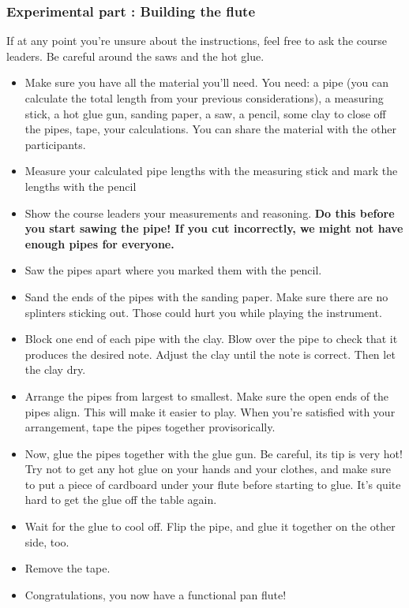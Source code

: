 \subsubsection{Experimental part : Building the flute}
If at any point you're unsure about the instructions, feel free to ask the course leaders. Be careful around the saws and the hot glue.
\begin{itemize}
    \item Make sure you have all the material you'll need. You need: a pipe (you can calculate the total length from your previous considerations), a measuring stick, a hot glue gun, sanding paper, a saw, a pencil, some clay to close off the pipes, tape, your calculations. You can share the material with the other participants.
    \item Measure your calculated pipe lengths with the measuring stick and mark the lengths with the pencil
    \item Show the course leaders your measurements and reasoning. \textbf{Do this before you start sawing the pipe! If you cut incorrectly, we might not have enough pipes for everyone.}
    \item Saw the pipes apart where you marked them with the pencil.
    \item Sand the ends of the pipes with the sanding paper. Make sure there are no splinters sticking out. Those could hurt you while playing the instrument.
    \item Block one end of each pipe with the clay. Blow over the pipe to check that it produces the desired note. Adjust the clay until the note is correct. Then let the clay dry.
    \item Arrange the pipes from largest to smallest. Make sure the open ends of the pipes align. This will make it easier to play. When you're satisfied with your arrangement, tape the pipes together provisorically.
    \item Now, glue the pipes together with the glue gun. Be careful, its tip is very hot! Try not to get any hot glue on your hands and your clothes, and make sure to put a piece of cardboard under your flute before starting to glue. It's quite hard to get the glue off the table again.
    \item Wait for the glue to cool off. Flip the pipe, and glue it together on the other side, too.
    \item Remove the tape.
    \item Congratulations, you now have a functional pan flute!
\end{itemize}